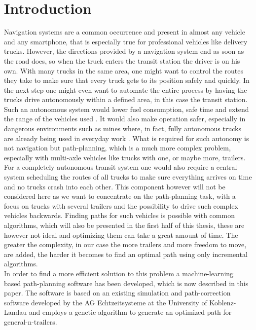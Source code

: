 \chapter{Introduction}
\label{cha:introduction}

Navigation systems are a common occurrence and present in almost any vehicle and any smartphone, that is especially true for professional vehicles like delivery trucks. However, the directions provided by a navigation system end as soon as the road does, so when the truck enters the transit station the driver is on his own. With many trucks in the same area, one might want to control the routes they take to make sure that every truck gets to its position safely and quickly. In the next step one might even want to automate the entire process by having the trucks drive autonomously within a defined area, in this case the transit station. Such an autonomous system would lower fuel consumption, safe time and extend the range of the vehicles used \cite{37}. It would also make operation safer, especially in dangerous environments such as mines where, in fact, fully autonomous trucks are already being used in everyday work \cite{38}. What is required for such autonomy is not navigation but path-planning, which is a much more complex problem, especially with multi-axle vehicles like trucks with one, or maybe more, trailers. For a completely autonomous transit system one would also require a central system scheduling the routes of all trucks to make sure everything arrives on time and no trucks crash into each other. This component however will not be considered here as we want to concentrate on the path-planning task, with a focus on trucks with several trailers and the possibility to drive such complex vehicles backwards. Finding paths for such vehicles is possible with common algorithms, which will also be presented in the first half of this thesis, these are however not ideal and optimizing them can take a great amount of time. The greater the complexity, in our case the more trailers and more freedom to move, are added, the harder it becomes to find an optimal path using only incremental algorithms.\\
In order to find a more efficient solution to this problem a machine-learning based path-planning software has been developed, which is now described in this paper. The software is based on an existing simulation and path-correction software developed by the AG Echtzeitsysteme at the University of Koblenz-Landau and employs a genetic algorithm to generate an optimized path for general-n-trailers.\\
